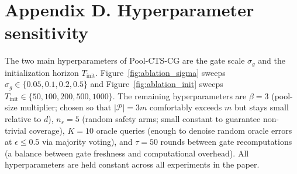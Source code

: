 \documentclass{article}
\theoremstyle{plain}
\theoremstyle{definition}
\theoremstyle{remark}
\newcommand{\Pool}{\mathcal{P}}
\newcommand{\algname}{Pool-CTS-CG}
\begin{document}
\section*{Appendix D. Hyperparameter sensitivity}
\label{app:hyperparams}

The two main hyperparameters of \algname{} are the gate scale $\sigma_g$ and the initialization horizon $T_{\mathrm{init}}$. Figure~\ref{fig:ablation_sigma} sweeps $\sigma_g \in \{0.05, 0.1, 0.2, 0.5\}$ and Figure~\ref{fig:ablation_init} sweeps $T_{\mathrm{init}} \in \{50, 100, 200, 500, 1000\}$. The remaining hyperparameters are $\beta = 3$ (pool-size multiplier; chosen so that $|\Pool| = 3m$ comfortably exceeds $m$ but stays small relative to $d$), $n_s = 5$ (random safety arms; small constant to guarantee non-trivial coverage), $K = 10$ oracle queries (enough to denoise random oracle errors at $\epsilon \leq 0.5$ via majority voting), and $\tau = 50$ rounds between gate recomputations (a balance between gate freshness and computational overhead). All hyperparameters are held constant across all experiments in the paper.
\end{document}
